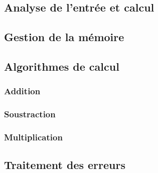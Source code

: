 \documentclass[letterpaper,12pt]{scrartcl}
\begin{document}
        
        \subsection{Analyse de l'entrée et calcul}
            
        
        \subsection{Gestion de la mémoire}
            
        
        \subsection{Algorithmes de calcul}
            
        
            \subsubsection{Addition}
                
            
            \subsubsection{Soustraction}
                
            
            \subsubsection{Multiplication}
                
            
        
        \subsection{Traitement des erreurs}
            
		
\end{document}
